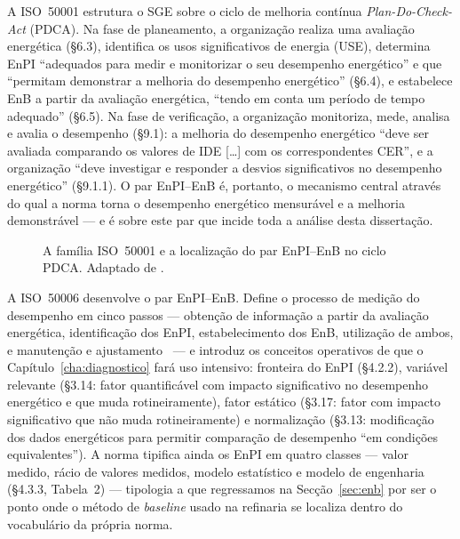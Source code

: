A ISO~50001 estrutura o SGE sobre o ciclo de melhoria contínua \emph{Plan-Do-Check-Act} (PDCA). Na fase de planeamento, a organização realiza uma avaliação energética (\S6.3), identifica os usos significativos de energia (USE), determina EnPI \enquote{adequados para medir e monitorizar o seu desempenho energético} e que \enquote{permitam demonstrar a melhoria do desempenho energético} (\S6.4), e estabelece EnB a partir da avaliação energética, \enquote{tendo em conta um período de tempo adequado} (\S6.5). Na fase de verificação, a organização monitoriza, mede, analisa e avalia o desempenho (\S9.1): a melhoria do desempenho energético \enquote{deve ser avaliada comparando os valores de IDE [\ldots] com os correspondentes CER}, e a organização \enquote{deve investigar e responder a desvios significativos no desempenho energético} (\S9.1.1). O par EnPI--EnB é, portanto, o mecanismo central através do qual a norma torna o desempenho energético mensurável e a melhoria demonstrável --- e é sobre este par que incide toda a análise desta dissertação.

\begin{figure}[htbp]
  \centering
  \caption[A família ISO 50001 e o par EnPI--EnB no ciclo PDCA]{A família ISO~50001 e a localização do par EnPI--EnB no ciclo PDCA. Adaptado de \cite{ISO50001_2018,ISO50006_2014}.}
  \label{fig:familia-iso}
\end{figure}

A ISO~50006 desenvolve o par EnPI--EnB. Define o processo de medição do desempenho em cinco passos --- obtenção de informação a partir da avaliação energética, identificação dos EnPI, estabelecimento dos EnB, utilização de ambos, e manutenção e ajustamento~\cite[Figura~2]{ISO50006_2014} --- e introduz os conceitos operativos de que o Capítulo~\ref{cha:diagnostico} fará uso intensivo: fronteira do EnPI (\S4.2.2), variável relevante (\S3.14: fator quantificável com impacto significativo no desempenho energético e que muda rotineiramente), fator estático (\S3.17: fator com impacto significativo que não muda rotineiramente) e normalização (\S3.13: modificação dos dados energéticos para permitir comparação de desempenho \enquote{em condições equivalentes}). A norma tipifica ainda os EnPI em quatro classes --- valor medido, rácio de valores medidos, modelo estatístico e modelo de engenharia (\S4.3.3, Tabela~2) --- tipologia a que regressamos na Secção~\ref{sec:enb} por ser o ponto onde o método de \emph{baseline} usado na refinaria se localiza dentro do vocabulário da própria norma.

